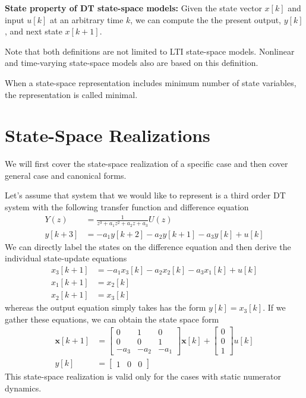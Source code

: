 \documentclass[twoside]{article}
\begin{document}
\textbf{State property of DT state-space models:} 
Given the state vector $x[k]$ and input $u[k]$ at an arbitrary time $k$, 
we can compute the the present output, $y[k]$, and next state $x[k+1]$.

Note that both definitions are not limited to LTI state-space models. 
Nonlinear and time-varying state-space models also are based on this 
definition. 

When a state-space representation includes minimum number of state 
variables, the representation is called minimal. 

\section{State-Space Realizations}

We will first cover the state-space realization of a specific case and
then cover general case and canonical forms. 

Let's assume that system that we would like to represent is a third
order DT system with the following transfer function and difference equation
%
\begin{align*}
Y(z) &= \frac{1}{z^3 + a_1 z^2 + a_2 z + a_3 } U(z)
\\
y[k+3] &=  -a_1 y[k+2] - a_2 y[k+1] - a_3 y[k] + u[k]
\end{align*}
%
We can directly label the states on the difference equation and then
derive the individual state-update equations
%
\begin{align*}
x_3[k+1] &=  -a_1 x_3[k] - a_2 x_2[k] - a_3 x_1[k] + u[k]
\\
x_1[k+1] &= x_2[k]
\\
x_2[k+1] &= x_3[k]
\end{align*}
%
whereas the output equation simply takes has the form $y[k] =
x_3[k]$. If we gather these equations, we can obtain the state space form
%
\begin{align*}
  \mathbf{x}[k+1] &= \left[ \begin{array}{ccc} 0 & 1 & 0 \\ 0 & 0 & 1
    \\ -a_3 & -a_2 & -a_1 \end{array} \right] \mathbf{x}[k]
   + 
  \left[ \begin{array}{c} 0\\ 0 
    \\ 1 \end{array} \right] u[k]
\\
y[k] &= \left[ \begin{array}{ccc} 1 &  0 & 0 \end{array} \right]
\end{align*}
%
This state-space realization is valid only for the cases with static numerator
dynamics. 
\end{document}
